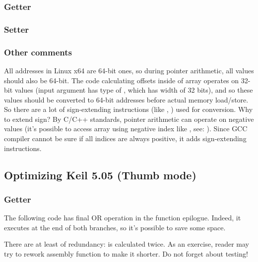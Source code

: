 \subsubsection{Getter}



\subsubsection{Setter}



\subsubsection{Other comments}

All addresses in Linux x64 are 64-bit ones, so during pointer arithmetic, all values should also be 64-bit.
The code calculating offsets inside of array operates on 32-bit values (input  argument has type of , which has width of 32 bits),
and so these values should be converted to 64-bit addresses before actual memory load/store.
So there are a lot of sign-extending instructions (like , ) used for conversion.
Why to extend sign? By C/C++ standards, pointer arithmetic can operate on negative values 
(it's possible to access array using negative index like , see: ).
Since GCC compiler cannot be sure if all indices are always positive, it adds sign-extending instructions.

\subsection{Optimizing Keil 5.05 (Thumb mode)}

\subsubsection{Getter}

The following code has final OR operation in the function epilogue.
Indeed, it executes at the end of both branches, so it's possible to save some space.



There are at least of redundancy:  is calculated twice.
As an exercise, reader may try to rework assembly function to make it shorter. Do not forget about testing!

